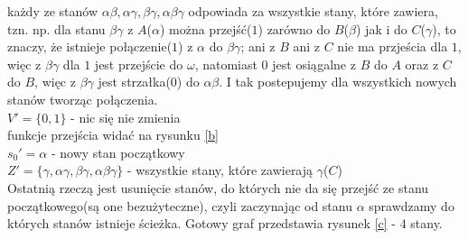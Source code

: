 {	każdy ze stanów $\alpha\beta, \alpha\gamma, \beta\gamma, \alpha\beta\gamma$ odpowiada za wszystkie stany, które zawiera, tzn. np. dla stanu $\beta\gamma$ z $A$($\alpha$) można przejść($1$) zarówno do $B$($\beta$) jak i do $C$($\gamma$), to znaczy, że istnieje połączenie($1$) z $\alpha$ do $\beta\gamma$; ani z $B$ ani z $C$ nie ma przjeścia dla $1$, więc z $\beta\gamma$ dla $1$ jest przejście do $\omega$, natomiast $0$ jest osiągalne z $B$ do $A$ oraz z $C$ do $B$, więc z $\beta\gamma$ jest strzałka($0$) do $\alpha\beta$. I tak postepujemy dla wszystkich nowych stanów tworząc połączenia.\\
	$V' = \{0,1\}$ - nic się nie zmienia\\
	funkcje przejścia widać na rysunku \ref{b}\\
	$s_0' = \alpha$ - nowy stan początkowy\\
	$Z' = \{\gamma, \alpha\gamma, \beta\gamma, \alpha\beta\gamma\}$ - wszystkie stany, które zawierają $\gamma$($C$)\\
	\newline
	Ostatnią rzeczą jest usunięcie stanów, do których nie da się przejść ze stanu początkowego(są one bezużyteczne), czyli zaczynając od stanu $\alpha$ sprawdzamy do których stanów istnieje ścieżka. Gotowy graf przedstawia rysunek \ref{c} - $4$ stany.
	
	
	\begin{figure}[h]
		\centering
		\quad
		\quad
		\caption{}
	\end{figure}
}

